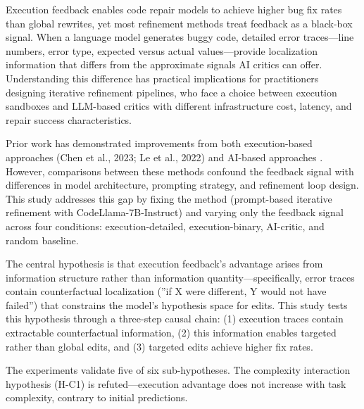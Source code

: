
Execution feedback enables code repair models to achieve higher bug fix rates than global rewrites, yet most refinement methods treat feedback as a black-box signal. When a language model generates buggy code, detailed error traces---line numbers, error type, expected versus actual values---provide localization information that differs from the approximate signals AI critics can offer. Understanding this difference has practical implications for practitioners designing iterative refinement pipelines, who face a choice between execution sandboxes and LLM-based critics with different infrastructure cost, latency, and repair success characteristics.

Prior work has demonstrated improvements from both execution-based approaches (Chen et al., 2023; Le et al., 2022) and AI-based approaches \citep{madaan2023self}. However, comparisons between these methods confound the feedback signal with differences in model architecture, prompting strategy, and refinement loop design. This study addresses this gap by fixing the method (prompt-based iterative refinement with CodeLlama-7B-Instruct) and varying only the feedback signal across four conditions: execution-detailed, execution-binary, AI-critic, and random baseline.

The central hypothesis is that execution feedback's advantage arises from information structure rather than information quantity---specifically, error traces contain counterfactual localization (''if X were different, Y would not have failed'') that constrains the model's hypothesis space for edits. This study tests this hypothesis through a three-step causal chain: (1) execution traces contain extractable counterfactual information, (2) this information enables targeted rather than global edits, and (3) targeted edits achieve higher fix rates.

The experiments validate five of six sub-hypotheses. The complexity interaction hypothesis (H-C1) is refuted---execution advantage does not increase with task complexity, contrary to initial predictions.
